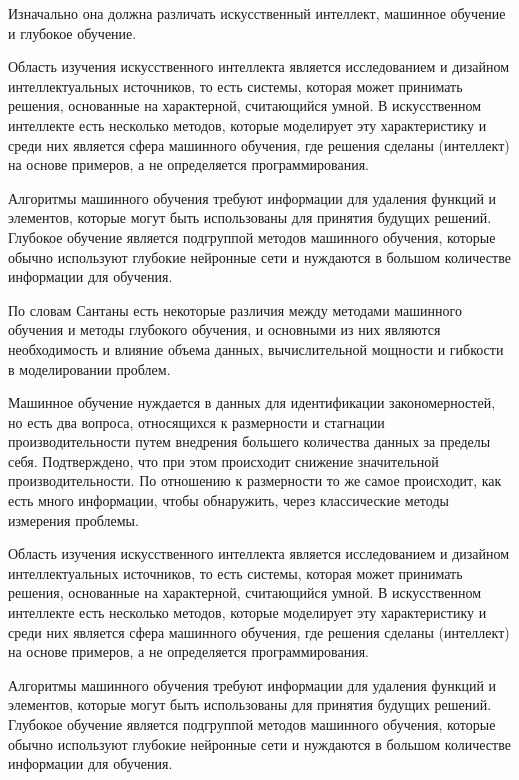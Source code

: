 Изначально она должна различать искусственный интеллект, машинное обучение и глубокое обучение.


 Область изучения искусственного интеллекта является исследованием и дизайном интеллектуальных источников, 
 то есть системы, которая может принимать решения,
 основанные на характерной, считающийся умной.
 В искусственном интеллекте есть несколько методов, 
 которые моделирует эту характеристику и среди них является сфера машинного обучения,
 где решения сделаны (интеллект) на основе примеров,
 а не определяется программирования. 

 Алгоритмы машинного обучения требуют информации для удаления функций и элементов, 
 которые могут быть использованы для принятия будущих решений. 
 Глубокое обучение является подгруппой методов машинного обучения,
 которые обычно используют глубокие нейронные сети и нуждаются 
 в большом количестве информации для обучения. 

 По словам Сантаны есть некоторые различия между методами машинного обучения и методы глубокого обучения, 
 и основными из них являются необходимость и влияние объема данных, 
 вычислительной мощности и гибкости в моделировании проблем.

 Машинное обучение нуждается в данных для идентификации закономерностей, но есть два вопроса, 
 относящихся к размерности и стагнации производительности путем внедрения большего количества данных за пределы себя. 
 Подтверждено, что при этом происходит снижение значительной производительности. 
 По отношению к размерности то же самое происходит, 
 как есть много информации, чтобы обнаружить, 
 через классические методы измерения проблемы.


 Область изучения искусственного интеллекта является исследованием и дизайном интеллектуальных источников, 
 то есть системы, которая может принимать решения, основанные на характерной, считающийся умной. 
 В искусственном интеллекте есть несколько методов, которые моделирует эту характеристику и среди них является сфера машинного обучения,
 где решения сделаны (интеллект) на основе примеров, а не определяется программирования.

 Алгоритмы машинного обучения требуют информации для удаления функций и элементов, 
 которые могут быть использованы для принятия будущих решений. 
 Глубокое обучение является подгруппой методов машинного обучения,
 которые обычно используют глубокие нейронные сети и нуждаются в большом количестве информации для обучения. 

